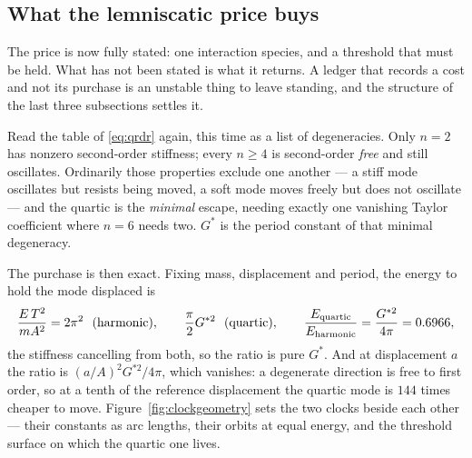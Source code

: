 \documentclass[11pt,a4paper]{article}
\newcommand{\Gstar}{{G^{*}}}
\theoremstyle{definition}
\theoremstyle{plain}
\theoremstyle{remark}
\begin{document}
\subsection{What the lemniscatic price buys}
\label{sec:gstarprice}

The price is now fully stated: one interaction species, and a threshold
that must be held. What has not been stated is what it returns. A ledger
that records a cost and not its purchase is an unstable thing to leave
standing, and the structure of the last three subsections settles it.

Read the table of \eqref{eq:qrdr} again, this time as a list of
degeneracies. Only $n=2$ has nonzero second-order stiffness; every
$n\ge4$ is second-order \emph{free} and still oscillates. Ordinarily
those properties exclude one another --- a stiff mode oscillates but
resists being moved, a soft mode moves freely but does not oscillate ---
and the quartic is the \emph{minimal} escape, needing exactly one
vanishing Taylor coefficient where $n=6$ needs two. $\Gstar$ is the period
constant of that minimal degeneracy.

The purchase is then exact. Fixing mass, displacement and period, the
energy to hold the mode displaced is
\begin{equation}
\frac{E\,T^2}{mA^2} = 2\pi^2 \ \ \text{(harmonic)}, \qquad
\frac{\pi}{2}G^{*2} \ \ \text{(quartic)}, \qquad
\frac{E_{\rm quartic}}{E_{\rm harmonic}} = \frac{G^{*2}}{4\pi} = 0.6966,
\label{eq:gstarprice}
\end{equation}
the stiffness cancelling from both, so the ratio is pure $G^*$. And at
displacement $a$ the ratio is $(a/A)^2 G^{*2}/4\pi$, which vanishes: a
degenerate direction is free to first order, so at a tenth of the
reference displacement the quartic mode is $144$ times cheaper to move.
Figure~\ref{fig:clockgeometry} sets the two clocks beside each other ---
their constants as arc lengths, their orbits at equal energy, and the
threshold surface on which the quartic one lives.
\end{document}
